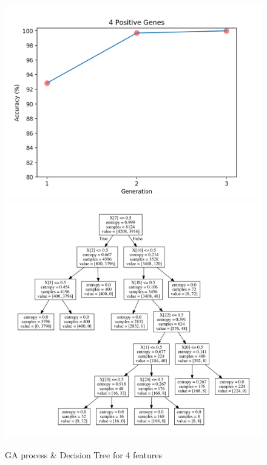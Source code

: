 \documentclass[runningheads]{llncs}
\begin{document}
\begin{figure}[htbp]
	\centering
	\includegraphics[scale=0.5]{GA4}
	\includegraphics[scale=0.5]{tree4}
	\caption{GA process \& Decision Tree for 4 features}
	\label{fig-4}
\end{figure}
\end{document}
